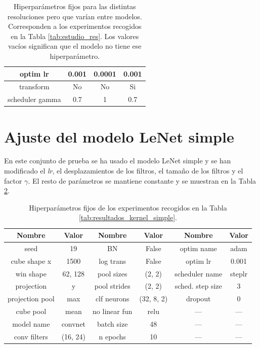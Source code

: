 \documentclass[a4paper,12pt,oneside,titlepage]{book}
\begin{document}
\begin{appendices}
\begin{table}[h!]
\begin{tabular}{|c|c|c|c|}
    optim lr        & 0.001      & 0.0001            & 0.001         \\ \hline
    transform       & No         & No                & Si            \\ \hline
    scheduler gamma & 0.7        & 1                 & 0.7           \\ \hline
    \end{tabular}
    \caption{Hiperparámetros fijos para las distintas resoluciones pero que varían entre modelos. Corresponden a los experimentos recogidos en la Tabla \ref{tab:estudio_res}. Los valores vacíos significan que el modelo no tiene ese hiperparámetro.}
    \label{tab:anexo_res_2}
    \end{table}
  
  \section{Ajuste del modelo LeNet simple}
  \label{an:4}
  
  En este conjunto de prueba se ha usado el modelo LeNet simple y se han modificado el \textit{lr}, el desplazamientos de los filtros, el tamaño de los filtros y el factor $\gamma$. El resto de parámetros se mantiene constante y se muestran en la Tabla \ref{tab:anexo_lenetsimple}.
 
  \begin{table}[h!]
    \centering
    \begin{tabular}{|c|c|c|c|c|c|}
    \hline
    Nombre          & Valor    & Nombre        & Valor      & Nombre           & Valor  \\ \hline
    seed            & 19       & BN            & False      & optim name       & adam   \\ \hline
    cube shape x    & 1500     & log trans     & False      & optim lr         & 0.001  \\ \hline
    win shape       & 62, 128  & pool sizes    & (2, 2)     & scheduler name   & steplr \\ \hline
    projection      & y        & pool strides  & (2, 2)     & sched. step size & 3      \\ \hline
    projection pool & max      & clf neurons   & (32, 8, 2) & dropout          & 0      \\ \hline
    cube pool       & mean     & no linear fun & relu       & ---              & ---    \\ \hline
    model name      & convnet  & batch size    & 48         & ---              & ---    \\ \hline
    conv filters    & (16, 24) & n epochs      & 10         & ---              & ---    \\ \hline
    \end{tabular}
    \caption{Hiperparámetros fijos de los experimentos recogidos en la Tabla \ref{tab:resultados_kernel_simple}.}
    \label{tab:anexo_lenetsimple}
  \end{table}


\end{appendices}
\end{document}
